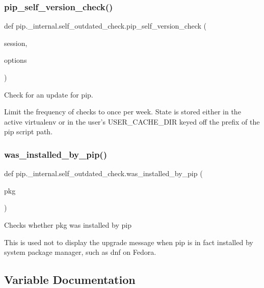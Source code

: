 \subsubsection{\texorpdfstring{pip\+\_\+self\+\_\+version\+\_\+check()}{pip\_self\_version\_check()}}
{\footnotesize\ttfamily def pip.\+\_\+internal.\+self\+\_\+outdated\+\_\+check.\+pip\+\_\+self\+\_\+version\+\_\+check (\begin{DoxyParamCaption}\item[{}]{session,  }\item[{}]{options }\end{DoxyParamCaption})}

\begin{DoxyVerb}Check for an update for pip.

Limit the frequency of checks to once per week. State is stored either in
the active virtualenv or in the user's USER_CACHE_DIR keyed off the prefix
of the pip script path.
\end{DoxyVerb}
 \mbox{\label{namespacepip_1_1__internal_1_1self__outdated__check_ad0acb8c33b098e33468091effd105c54}} 
\subsubsection{\texorpdfstring{was\+\_\+installed\+\_\+by\+\_\+pip()}{was\_installed\_by\_pip()}}
{\footnotesize\ttfamily def pip.\+\_\+internal.\+self\+\_\+outdated\+\_\+check.\+was\+\_\+installed\+\_\+by\+\_\+pip (\begin{DoxyParamCaption}\item[{}]{pkg }\end{DoxyParamCaption})}

\begin{DoxyVerb}Checks whether pkg was installed by pip

This is used not to display the upgrade message when pip is in fact
installed by system package manager, such as dnf on Fedora.
\end{DoxyVerb}
 

\subsection{Variable Documentation}
\mbox{\label{namespacepip_1_1__internal_1_1self__outdated__check_a588d105ffdaf709ec245d8bff02d38eb}} 
